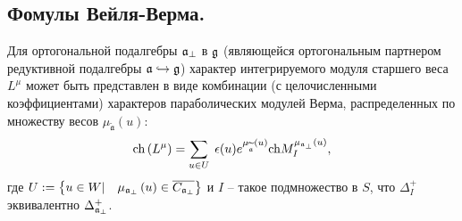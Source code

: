 \subsection{Фомулы Вейля-Верма.}

\begin{statement}
Для ортогональной подалгебры  $\frak{a}_{\perp }$ в $\frak{g}$ (являющейся ортогональным партнером редуктивной подалгебры $\frak{a}\hookrightarrow \frak{g}$) характер интегрируемого модуля старшего веса  $L^{\mu }$ может быть представлен в виде комбинации (с целочисленными коэффициентами) характеров параболических модулей Верма, распределенных по множеству весов $\mu _{\widetilde{\mathfrak{a}}}\left(
u\right)$:
\begin{equation}
\mathrm{ch}\left( L^{\mu }\right) =\sum_{u\in U}\;\epsilon (u)e^{\mu _{%
\widetilde{\frak{a}}}\left( u\right) }\mathrm{ch}M_{I}^{\mu _{\frak{a}%
_{\perp }}\left( u\right) },  \label{gen Weyl-Verma}
\end{equation}
где  $U:=\left\{ u\in W|\quad \mu _{\frak{a}_{\perp }}\left( u\right) \in
\overline{C_{\frak{a}_{\perp }}}\right\} $ и $I$ -- такое подмножество в  $S$, что $\Delta _{I}^{+}$ эквивалентно $\Delta _{\frak{a}_{\perp }}^{+}$.
\end{statement}

